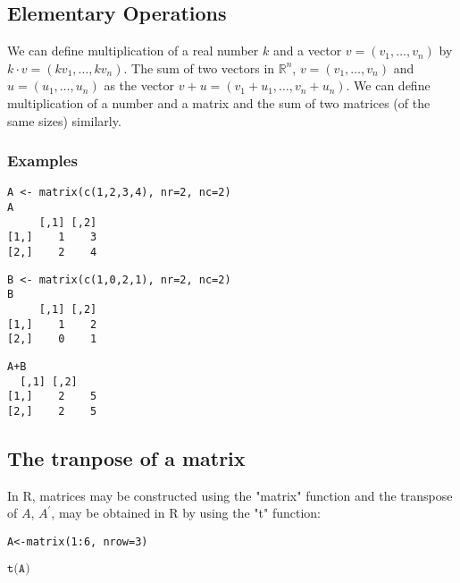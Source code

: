 \documentclass[12pt,a4paper]{article}
\theoremstyle{regla}
\theoremstyle{remark}
\theoremstyle{definition}
\theoremstyle{nonumberbreak}
\begin{document}
\subsection{Elementary Operations}
\begin{fbox}
\begin{minipage}{0.97\textwidth}
We can define multiplication of a real number $k$ and a vector $v=(v_1,\ldots,v_n)$ by $k\cdot v=(kv_1,\ldots,kv_n)$. The sum of two vectors in $\mathbb{R}^n$, $v=(v_1,\ldots,v_n)$ and $u=(u_1,\ldots,u_n)$ as the vector $v+u=(v_1+u_1,\ldots,v_n+u_n)$. We can define multiplication of a number and a matrix and the sum of two matrices (of the same sizes) similarly.
\end{minipage}
\end{fbox}
\subsubsection{Examples}
\begin{xmpl}
\begin{lstlisting}
A <- matrix(c(1,2,3,4), nr=2, nc=2)
A
     [,1] [,2]
[1,]    1    3
[2,]    2    4
\end{lstlisting}

\begin{lstlisting}
B <- matrix(c(1,0,2,1), nr=2, nc=2)
B
     [,1] [,2]
[1,]    1    2
[2,]    0    1
\end{lstlisting}

\begin{lstlisting}
A+B
  [,1] [,2]
[1,]    2    5
[2,]    2    5
\end{lstlisting}
\end{xmpl}

\subsection{The tranpose of a matrix}
\begin{fbox}
\begin{minipage}{0.97\textwidth}
In R, matrices may be constructed using the "matrix" function and the transpose of $A$, $A^\prime$, may be obtained in R by using the "t" function:


\texttt{A<-matrix(1:6, nrow=3)}

$\texttt{t(A)}$


\end{minipage}
\end{fbox}
\end{document}
